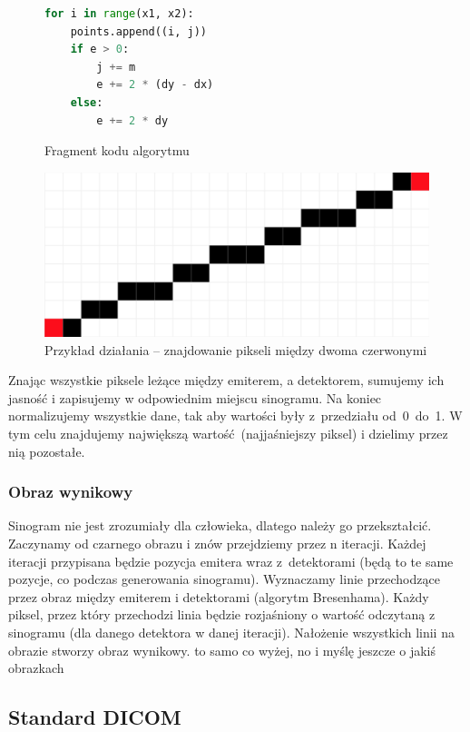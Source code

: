 \documentclass[polish,polish,a4paper]{article}
\begin{document}
				\begin{figure}[!h]
					\centering
					\begin{minipage}{0.4\linewidth}
						\begin{lstlisting}[language=Python, frame=single]
for i in range(x1, x2):
    points.append((i, j))
    if e > 0:
        j += m
        e += 2 * (dy - dx)
    else:
        e += 2 * dy
						\end{lstlisting}
						\caption{Fragment kodu algorytmu}
					\end{minipage}
					\hfill
					\begin{minipage}{0.45\linewidth}
						\includegraphics[width=\textwidth]{img/bresenham.png}
						\caption{Przykład działania -- znajdowanie pikseli między dwoma czerwonymi}
					\end{minipage}
				\end{figure}
				
				Znając wszystkie piksele leżące między emiterem, a detektorem, 
				sumujemy ich jasność i zapisujemy w odpowiednim miejscu sinogramu.
				Na koniec normalizujemy wszystkie dane, tak aby wartości były z~przedziału od~0~do~1. W tym celu znajdujemy największą wartość (najjaśniejszy piksel) i dzielimy przez nią pozostałe.
				
				\subsubsection{Obraz wynikowy}
				Sinogram nie jest zrozumiały dla człowieka, 
				dlatego należy go przekształcić.
				Zaczynamy od czarnego obrazu i znów przejdziemy przez n iteracji.
				Każdej iteracji przypisana będzie pozycja emitera wraz z~detektorami 
				(będą to te same pozycje, co podczas generowania sinogramu).
				Wyznaczamy linie przechodzące przez obraz między emiterem i detektorami (algorytm Bresenhama).
				Każdy piksel, przez który przechodzi linia będzie rozjaśniony o wartość odczytaną z sinogramu 
				(dla danego detektora w danej iteracji). 
				Nałożenie wszystkich linii na obrazie stworzy obraz wynikowy.
				{\color{red} to samo co wyżej, no i myślę jeszcze o jakiś obrazkach}
			\subsection{Standard DICOM}
\end{document}
